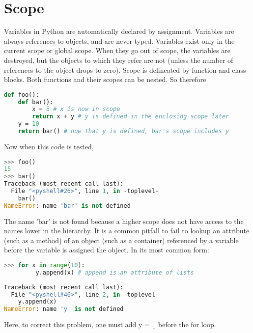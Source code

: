 \section{Scope}
Variables in Python are automatically declared by assignment. Variables are
always references to objects, and are never typed. Variables exist only in the
current scope or global scope. When they go out of scope, the variables are
destroyed, but the objects to which they refer are not (unless the number of
references to the object drops to zero).  Scope is delineated by function and
class blocks. Both functions and their scopes can be nested. So therefore
\lstset{basicstyle=\scriptsize, numbers=left, captionpos=b, tabsize=4}
\begin{lstlisting}[caption=Scope Example,language={Python},
xleftmargin=15pt, label=lst:scopeexample]
def foo():
    def bar():
        x = 5 # x is now in scope
        return x + y # y is defined in the enclosing scope later
    y = 10
    return bar() # now that y is defined, bar's scope includes y
\end{lstlisting}

Now when this code is tested,
\lstset{basicstyle=\scriptsize, numbers=left, captionpos=b, tabsize=4}
\begin{lstlisting}[caption=Scope Error,language={Python},
xleftmargin=15pt, label=lst:scopeerror]
>>> foo()
15
>>> bar()
Traceback (most recent call last):
  File "<pyshell#26>", line 1, in -toplevel-
    bar()
NameError: name 'bar' is not defined
\end{lstlisting}

The name 'bar' is not found because a higher scope does not have access to the
names lower in the hierarchy.  It is a common pitfall to fail to lookup an
attribute (such as a method) of an object (such as a container) referenced by a
variable before the variable is assigned the object. In its most common form:
\lstset{basicstyle=\scriptsize, numbers=left, captionpos=b, tabsize=4}
\begin{lstlisting}[caption=Another Scope Error,language={Python},
xleftmargin=15pt, label=lst:anotherscopeerror]
>>> for x in range(10):
         y.append(x) # append is an attribute of lists
 
Traceback (most recent call last):
  File "<pyshell#46>", line 2, in -toplevel-
    y.append(x)
NameError: name 'y' is not defined
\end{lstlisting}
Here, to correct this problem, one must add y = [] before the for loop.
